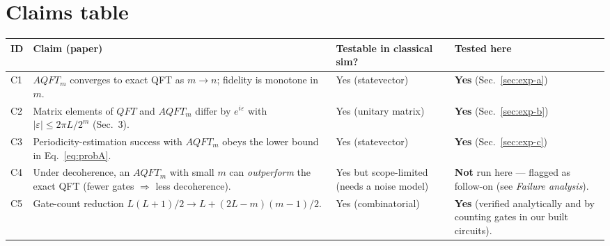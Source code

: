 \documentclass[11pt]{article}
\begin{document}
\section{Claims table}
\begin{longtable}{@{}p{}p{}p{}p{}@{}}
\toprule
ID & Claim (paper) & Testable in classical sim? & Tested here \\
\midrule
C1 & $AQFT_m$ converges to exact QFT as $m\to n$; fidelity is monotone in $m$. & Yes (statevector) & \textbf{Yes} (Sec.~\ref{sec:exp-a}) \\
C2 & Matrix elements of $QFT$ and $AQFT_m$ differ by $e^{i\varepsilon}$ with $|\varepsilon|\le 2\pi L/2^m$ (Sec.~3). & Yes (unitary matrix) & \textbf{Yes} (Sec.~\ref{sec:exp-b}) \\
C3 & Periodicity-estimation success with $AQFT_m$ obeys the lower bound in Eq.~\eqref{eq:probA}. & Yes (statevector) & \textbf{Yes} (Sec.~\ref{sec:exp-c}) \\
C4 & Under decoherence, an $AQFT_m$ with small $m$ can \emph{outperform} the exact QFT (fewer gates $\Rightarrow$ less decoherence). & Yes but scope-limited (needs a noise model) & \textbf{Not} run here --- flagged as follow-on (see \emph{Failure analysis}). \\
C5 & Gate-count reduction $L(L+1)/2 \to L + (2L-m)(m-1)/2$. & Yes (combinatorial) & \textbf{Yes} (verified analytically and by counting gates in our built circuits). \\
\bottomrule
\end{longtable}
\end{document}
